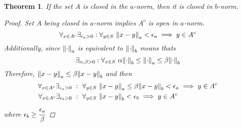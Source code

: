 \documentclass[]{article}
\newcommand{\st}{\ : \ }
\newtheorem{theorem}{Theorem}
\begin{document}
\begin{theorem}
    If the set $A$ is closed in the $a$-norm, then it is closed in $b$-norm.
    \begin{proof}
        Set $A$ being closed in $a$-norm implies $A^c$ is open in $a$-norm.
        \[\forall_{x \in A^c} \exists_{\epsilon_a>0} : \forall_{y \in S} \ \norm{x - y}_a < \epsilon_a \implies y \in A^c\]
        Additionally, since $\norm{\cdot}_a$ is equivalent to $\norm{\cdot}_b$ means thats
        \[\exists_{\alpha,\beta > 0} : 
        \forall_{x\in S} \  \alpha \norm{\cdot}_b \leq \norm{\cdot}_a \leq \beta \norm{\cdot}_b\]
        Therefore, $\norm{x - y}_a \leq \beta \norm{x-y}_b$ and then 
        \begin{align*}
            \forall_{x \in A^c} \exists_{\epsilon_a>0} 
            &\st \forall_{y \in S} \ \norm{x - y}_a \leq \beta \norm{x - y}_b < \epsilon_a \implies y \in A^c\\
            \forall_{x \in A^c} \exists_{\epsilon_b>0} &\st \forall_{y \in S} \ \norm{x - y}_b < \epsilon_b \implies y \in A^c
        \end{align*}
        where $ \epsilon_b \geq \cfrac{\epsilon_a}{\beta}$
    \end{proof}
\end{theorem}

\newpage
\end{document}
